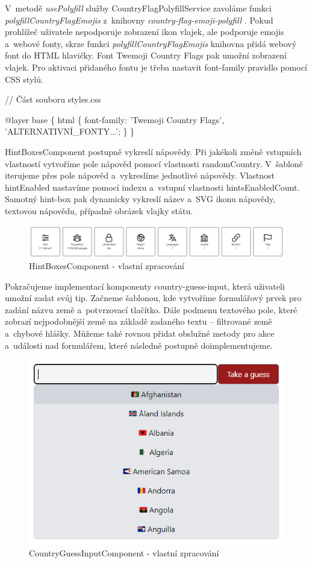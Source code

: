 V~metodě \emph{usePolyfill} služby CountryFlagPolyfillService zavoláme funkci \emph{polyfillCountryFlagEmojis} z~knihovny \emph{country-flag-emoji-polyfill} \cite{countryflagemojipolyfill}. 
Pokud prohlížeč uživatele nepodporuje zobrazení ikon vlajek, ale podporuje emojis a~webové fonty, skrze funkci \emph{polyfillCountryFlagEmojis} knihovna přidá webový font do HTML hlavičky. 
Font Twemoji Country Flags pak umožní zobrazení vlajek. Pro aktivaci přidaného fontu je třeba nastavit font-family pravidlo pomocí CSS stylů.

\begin{prog}
// Část souboru styles.css

@layer base \{
  html \{
    font-family: 'Twemoji Country Flags', 'ALTERNATIVNÍ_FONTY...';
  \}
\}
\end{prog}

HintBoxesComponent postupně vykreslí nápovědy. Při jakékoli změně vstupních vlastností vytvoříme pole nápověd pomocí vlastnosti randomCountry. 
V~šabloně iterujeme přes pole nápověd a~vykreslíme jednotlivé nápovědy. Vlastnost hintEnabled nastavíme pomocí indexu a~vstupní vlastnosti hintsEnabledCount. 
Samotný hint-box pak dynamicky vykreslí název a~SVG ikonu nápovědy, textovou nápovědu, případně obrázek vlajky státu.

\begin{figure}[htb]
	\centering
		\includegraphics[width=.97\textwidth]{images/HintBoxes.jpg}
	\caption[HintBoxesComponent]{HintBoxesComponent - vlastní zpracování}
	\label{fig:angularhintboxes}
\end{figure}

Pokračujeme implementací komponenty country-guess-input, která uživateli umožní zadat svůj tip. 
Začneme šablonou, kde vytvoříme formulářový prvek pro zadání názvu země a~potvrzovací tlačítko. 
Dále podmenu textového pole, které zobrazí nejpodobnější země na základě zadaného textu -- filtrované země a~chybové hlášky. 
Můžeme také rovnou přidat obslužné metody pro akce a~události nad formulářem, které následně postupně doimplementujeme.

\begin{figure}[htb]
	\centering
		\includegraphics[width=.5\textwidth]{images/CountryGuessInput.jpg}
	\caption[CountryGuessInputComponent]{CountryGuessInputComponent - vlastní zpracování}
	\label{fig:angularcountryguessinput}
\end{figure}

